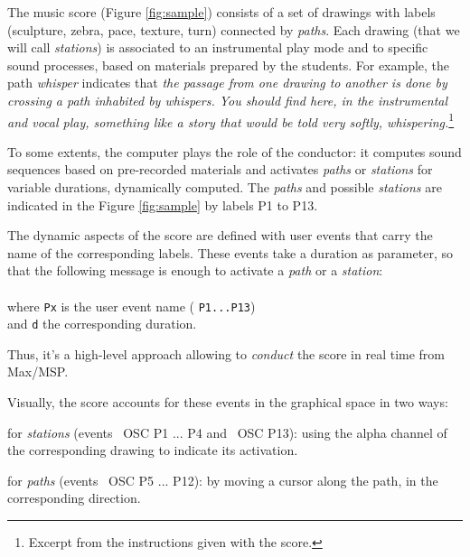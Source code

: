 \documentclass{article}
\newcommand{\OSC}[1]	{{\fontsize{8.5pt}{8pt} \selectfont\texttt{#1}}}
\newcommand{\tab}{\hspace*{4mm}}
\let\olditemize\itemize
\let\oldenditemize\enditemize
\renewenvironment{itemize} 	{\olditemize \renewcommand{\labelitemi}{$\bullet$} \setlength{\itemsep}{0mm}}{\oldenditemize}
\begin{document}
The music score (Figure \ref{fig:sample}) consists of a set of drawings with labels (sculpture, zebra, pace, texture, turn) connected by \emph{paths}. Each drawing (that we will call \emph{stations}) is associated to an instrumental play mode and to specific sound processes, based on materials prepared by the students. For example, the path \emph{whisper} indicates that \emph{the passage from one drawing to another is done by crossing a path inhabited by whispers. 
You should find here, in the instrumental and vocal play, something like a story that would be told very softly, whispering.}\footnote{Excerpt from the instructions given with the score.}

To some extents, the computer plays the role of
the conductor: it computes sound sequences based on pre-recorded materials and activates \emph{paths} or \emph{stations} for variable durations, dynamically computed. The \emph{paths} and possible \emph{stations} are indicated in the Figure \ref{fig:sample} by
 labels P1 to P13.

The dynamic aspects of the score are defined with user events that carry the name of the corresponding labels. These events take a duration as parameter, so that the following message is enough to activate a \emph{path} or a \emph{station}:\\
\tab \tab \OSC{/ITL/scene Px d} \\
where \OSC{Px} is the user event name (\OSC{P1...P13})\\
 and \OSC{d} the corresponding duration. 
 
Thus, it's a high-level approach 
allowing to \emph{conduct} the score in real time 
from Max/MSP.

Visually, the score accounts for these events in 
the graphical space in two ways:
\begin{itemize}
\item for \emph{stations} (events \ OSC {P1 ... P4} and \ OSC {P13}): using the alpha channel of the corresponding 
drawing to indicate its activation.
\item for \emph{paths} (events \ OSC {P5 ... P12}): by moving a cursor along the path, in the corresponding direction.
\end{itemize}
\end{document}
